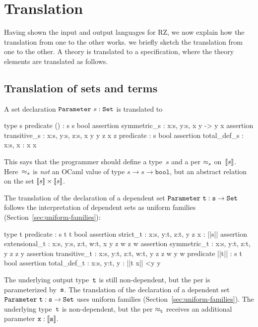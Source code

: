 \section{Translation}
\label{sec:translation}

Having shown the input and output languages for RZ,
%
\iflong
we now explain how the translation from one to the other works.
\else
we briefly sketch the translation from one to the other.
\fi
%
A theory is translated to a
specification, where the theory elements are translated as follows.



\subsection{Translation of sets and terms}
\label{sec:transl-sets-terms}

A set declaration $\mathtt{Parameter}\ s : \mathtt{Set}$ is translated to
%
\begin{source}
type s
predicate () : s \iTo s \iTo bool
assertion symmetric_s :  \iForall x:s, y:s, x  y -> y  x
assertion transitive_s : \iForall x:s, y:s, z:s, x  y \iAnd y  z \iTo x  z
predicate  : s \iTo bool
assertion total_def_s :  \iForall x:s,  x :  \iIff x  x
\end{source}
%
This says that the programmer should define a type~$s$ and a per
$\approx_s$ on~$[\![s]\!]$. Here~$\approx_s$ is \emph{not} an OCaml value
of type $s \to s \to \mathtt{bool}$, but an abstract relation on the
set $[\![s]\!] \times [\![s]\!]$.

\iflong
The translation of the declaration of a dependent set
$\mathtt{Parameter}\ \mathtt{t} : \mathtt{s} \to \mathtt{Set}$ follows the interpretation of dependent
sets as uniform families (Section~\ref{sec:uniform-families}):
%
\begin{source}
type t
predicate  : s \iTo t \iTo t \iTo bool
assertion strict_t :  \iForall x:s, y:t, z:t, y  z \iTo x : ||s||
assertion extensional_t :
  \iForall x:s, y:s, z:t, w:t, x  y \iTo z  w \iTo z  w
assertion symmetric_t : \iForall x:s, y:t, z:t, y  z \iTo z  y
assertion transitive_t :
  \iForall x:s, y:t, z:t, w:t, y  z \iAnd z  w \iTo y  w
predicate ||t|| : s \iTo t \iTo bool
assertion total_def_t :  \iForall x:s, y:t, y : ||t x|| <\iTo y  y
\end{source}
%
The underlying output type~$\mathtt{t}$ is still non-dependent, but the per is
parameterized by~$\mathtt{s}$.
\else %
The translation of the declaration of a dependent set
$\mathtt{Parameter}\ \mathtt{t} : \mathtt{s} \to \mathtt{Set}$ uses uniform families
(Section~\ref{sec:uniform-families}). The underlying type~$\mathtt{t}$ is
non-dependent, but the per $\approx_{\mathtt{t}}$ receives an additional
parameter $\mathtt{x} : [\![\mathtt{s}]\!]$.
\fi %

